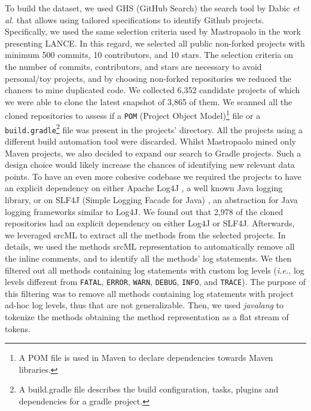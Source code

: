 To build the dataset, we used GHS (GitHub Search) the search tool by Dabic \emph{et al.} \cite{dabic2021sampling} that allows using tailored specifications to identify Github \cite{github} projects. Specifically, we used the same selection criteria used by Mastropaolo \etal \cite{mastropaolo2022using} in the work presenting LANCE.
In this regard, we selected all public non-forked \java projects with minimum 500 commits, 10 contributors, and 10 stars.
The selection criteria on the number of commits, contributors, and stars are necessary to avoid personal/toy projects, and 
by choosing non-forked repositories we reduced the chances to mine duplicated code. 
We collected 6,352 candidate projects of which we were able to clone the latest snapshot of 3,865 of them. 
We scanned all the cloned repositories to assess if a \texttt{POM} (Project Object Model)\footnote{A POM file is used in Maven to declare dependencies towards Maven libraries.} file or a \texttt{build.gradle}\footnote{A build.gradle file describes the build configuration, tasks, plugins and dependencies for a gradle project.} file was present in the projects' directory.
All the projects using a different build automation tool were discarded.
Whilst Mastropaolo \etal \cite{mastropaolo2022using} mined only Maven projects, we also decided to expand our search to Gradle projects. Such a design choice would likely increase the chances of identifying new relevant data points.
To have an even more cohesive codebase we required the projects to have an explicit dependency on either Apache Log4J \cite{log4j}, a well known Java logging library, or on SLF4J (Simple Logging Facade for Java) \cite{slf4j}, an abstraction for Java logging frameworks similar to Log4J.
We found out that 2,978 of the cloned repositories had an explicit dependency on either Log4J or SLF4J. Afterwards, we leveraged srcML \cite{srcml} to extract all the \java methods from the selected projects. In details, we used the \java methods srcML representation to automatically remove all the inline comments, and to identify all the methods' log statements. We then filtered out all methods containing log statements with custom log levels (\emph{i.e.}, log levels different from \texttt{FATAL}, \texttt{ERROR}, \texttt{WARN}, \texttt{DEBUG}, \texttt{INFO}, and \texttt{TRACE}).
The purpose of this filtering was to remove all methods containing log statements with project ad-hoc log levels, thus that are not generalizable.
Then, we used \emph{javalang} \cite{javalang} to tokenize the methods obtaining the method representation as a flat stream of tokens.
